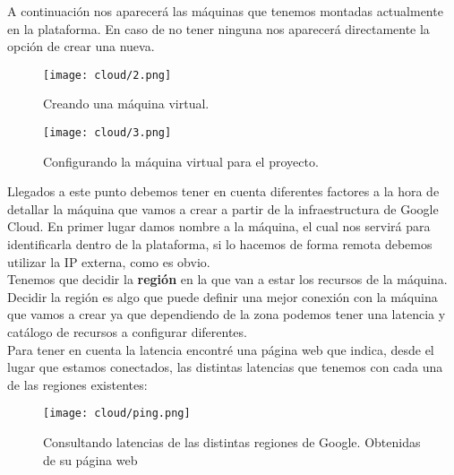 \documentclass[11pt,fleqn]{book} %
\begin{document}
A continuación nos aparecerá las máquinas que tenemos montadas actualmente en la plataforma. En caso de no tener ninguna nos aparecerá directamente la opción de crear una nueva. \\

\begin{figure}[H]
	\centering\texttt{[image: cloud/2.png]}
	\caption{Creando una máquina virtual.}
	\label{fig:cloud2} %
\end{figure}

\begin{figure}[H]
	\centering\texttt{[image: cloud/3.png]}
	\caption{Configurando la máquina virtual para el proyecto.}
	\label{fig:cloud3} %
\end{figure}

Llegados a este punto debemos tener en cuenta diferentes factores a la hora de detallar la máquina que vamos a crear a partir de la infraestructura de Google Cloud. En primer lugar damos nombre a la máquina, el cual nos servirá para identificarla dentro de la plataforma, si lo hacemos de forma remota debemos utilizar la IP externa, como es obvio. \\

Tenemos que decidir la \textbf{región} en la que van a estar los recursos de la máquina. Decidir la región es algo que puede definir una mejor conexión con la máquina que vamos a crear ya que dependiendo de la zona podemos tener una latencia y catálogo de recursos a configurar diferentes. \\

Para tener en cuenta la latencia encontré una página web que indica, desde el lugar que estamos conectados, las distintas latencias que tenemos con cada una de las regiones existentes:

\begin{figure}[H]
	\centering\texttt{[image: cloud/ping.png]}
	\caption{Consultando latencias de las distintas regiones de Google. Obtenidas de su página web \cite{article:ping}}
	\label{fig:cloudping} %
\end{figure}
\end{document}
